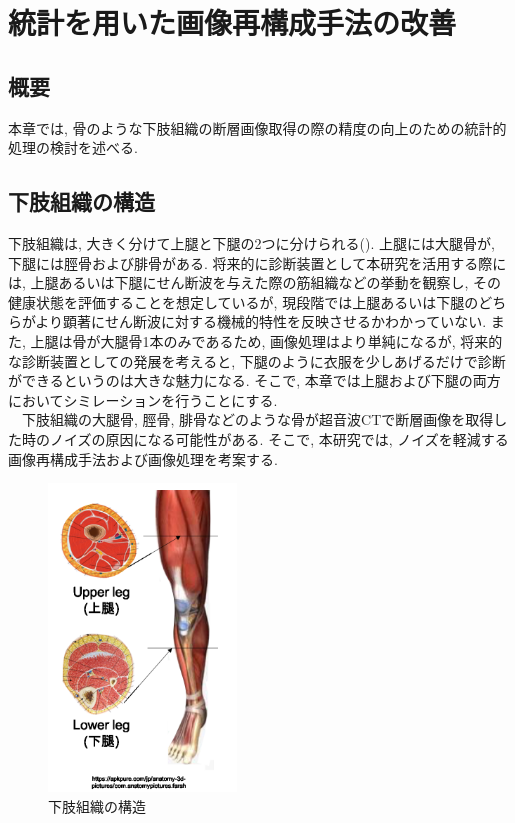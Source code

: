 \chapter{統計を用いた画像再構成手法の改善}
\newpage
\section{概要}
本章では, 骨のような下肢組織の断層画像取得の際の精度の向上のための統計的処理の検討を述べる.
\section{下肢組織の構造}
下肢組織は, 大きく分けて上腿と下腿の2つに分けられる(). 上腿には大腿骨が, 下腿には脛骨および腓骨がある. 将来的に診断装置として本研究を活用する際には, 上腿あるいは下腿にせん断波を与えた際の筋組織などの挙動を観察し, その健康状態を評価することを想定しているが, 現段階では上腿あるいは下腿のどちらがより顕著にせん断波に対する機械的特性を反映させるかわかっていない. また, 上腿は骨が大腿骨1本のみであるため, 画像処理はより単純になるが, 将来的な診断装置としての発展を考えると, 下腿のように衣服を少しあげるだけで診断ができるというのは大きな魅力になる. そこで, 本章では上腿および下腿の両方においてシミレーションを行うことにする. 
\\\ \ 下肢組織の大腿骨, 脛骨, 腓骨などのような骨が超音波CTで断層画像を取得した時のノイズの原因になる可能性がある. そこで, 本研究では, ノイズを軽減する画像再構成手法および画像処理を考案する. 
\begin{figure}[H]
  \begin{center}
    \includegraphics[width=50mm]{fig/kashisoshiki.pdf}
  \end{center}
  \caption{下肢組織の構造}
\end{figure}
